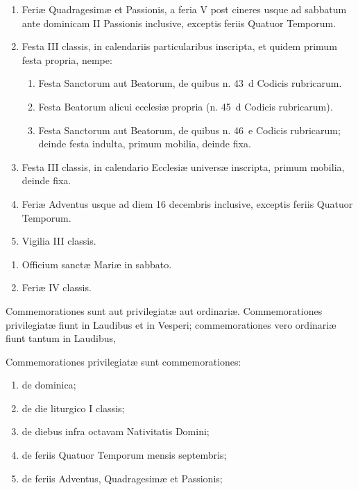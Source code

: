 \documentclass[vesperale_romanum.tex]{subfiles}
\begin{document}
 \begin{enumerate}[nosep]
\item Feriæ Quadragesimæ et Passionis, a feria V post cineres usque ad sabbatum ante dominicam II Passionis inclusive, exceptis feriis Quatuor Temporum.
\item Festa III classis, in calendariis particularibus inscripta, et quidem primum festa propria, nempe:
\begin{enumerate}[nosep,label=\arabic*.]
\item Festa Sanctorum aut Beatorum, de quibus n. 43~d  Codicis rubricarum.
\item Festa Beatorum alicui ecclesiæ propria (n. 45~d  Codicis rubricarum).
\item Festa Sanctorum aut Beatorum, de quibus n. 46~e  Codicis rubricarum; deinde festa indulta, primum mobilia, deinde fixa.
\end{enumerate}
\item Festa III classis, in calendario Ecclesiæ universæ inscripta, primum mobilia, deinde fixa.
\item Feriæ Adventus usque ad diem 16 decembris inclusive, exceptis feriis Quatuor Temporum.
\item Vigilia III classis.
\end{enumerate}


 \begin{enumerate}[nosep]
\item
Officium sanctæ Mariæ in sabbato.
\item
Feriæ IV classis.
\end{enumerate}


Commemorationes sunt aut privilegiatæ aut ordinariæ. Commemorationes privilegiatæ fiunt in Laudibus et in Vesperi; commemorationes vero ordinariæ fiunt tantum in Laudibus,

Commemorationes privilegiatæ sunt commemora­tiones:
\begin{enumerate}[nosep,label=\alph*.]
\item de dominica;
\item de die liturgico I classis;
\item de diebus infra octavam Nativitatis Domini;
\item de feriis Quatuor Temporum mensis septembris;
\item de feriis Adventus, Quadragesimæ et Passionis;
\end{enumerate}
\end{document}
